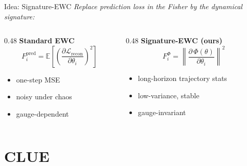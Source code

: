 \documentclass[10pt]{beamer}
\begin{document}
\begin{frame}{Idea: Signature-EWC}
\textit{Replace prediction loss in the Fisher by the dynamical signature:}
\bigskip
\begin{columns}[T]
  \begin{column}{0.48\textwidth}
    \centering\textbf{Standard EWC}
    \[
      F_i^{\mathrm{pred}} = \mathbb{E}\!\left[\!\left(\frac{\partial\mathcal{L}_\mathrm{recon}}{\partial\theta_i}\right)^{\!2}\right]
    \]
    \vspace{-3mm}
    \begin{itemize}
      \item one-step MSE
      \item noisy under chaos
      \item gauge-dependent
    \end{itemize}
  \end{column}
  \begin{column}{0.48\textwidth}
    \centering\textbf{Signature-EWC (ours)}
    \[
      F_i^{\Phi} = \left\|\frac{\partial\,\Phi(\theta)}{\partial\theta_i}\right\|^2
    \]
    \vspace{-3mm}
    \begin{itemize}
      \item long-horizon trajectory stats
      \item low-variance, stable
      \item gauge-invariant
    \end{itemize}
  \end{column}
\end{columns}
\bigskip
{}
\end{frame}

\section{CLUE}
\end{document}
